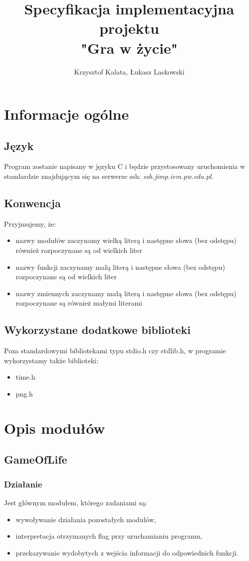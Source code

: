 \documentclass{article}
\title{Specyfikacja implementacyjna projektu\\ "Gra w życie"}
\author{Krzysztof Kalata, Łukasz Laskowski}
\begin{document}
\maketitle

\tableofcontents
\newpage

\section{Informacje ogólne}
\subsection{Język}
Program zostanie napisany w języku C i będzie przystosowany uruchomienia w standardzie znajdującym
się na serwerze ssh: \textit{ssh.jimp.iem.pw.edu.pl}.
\subsection{Konwencja}
Przyjmujemy, że:
\begin{itemize}
  \item nazwy modułów zaczynamy wielką literą i następne słowa (bez odstępu) również rozpoczynane są
    od wielkich liter
  \item nazwy funkcji zaczynamy małą literą i następne słowa (bez odstępu) rozpoczynane są od wielkich
    liter
  \item nazwy zmiennych zaczynamy małą literą i następne słowa (bez odstępu) rozpoczynane są również 
     małymi literami
\end{itemize}
\subsection{Wykorzystane dodatkowe biblioteki}
Poza standardowymi bibliotekami typu stdio.h czy stdlib.h, w programie wykorzystamy także biblioteki:
\begin{itemize}
  \item time.h
  \item png.h
\end{itemize}

\section{Opis modułów}
\subsection{GameOfLife}
\subsubsection{Działanie}
Jest głównym modułem, którego zadaniami są:
\begin{itemize}
  \item wywoływanie działania pozostałych modułów,
  \item interpretacja otrzymanych flag przy uruchamianiu programu,
  \item przekazywanie wydobytych z wejścia informacji do odpowiednich funkcji.
\end{itemize}
\end{document}
